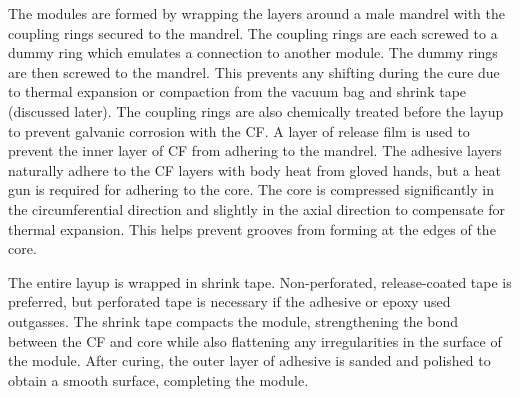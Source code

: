 \documentclass{aiaa-tc}%
\begin{document}
The modules are formed by wrapping the layers around a male mandrel with the coupling rings secured to the mandrel.
The coupling rings are each screwed to a dummy ring which emulates a connection to another module. The dummy rings are then screwed to the mandrel.
This prevents any shifting during the cure due to thermal expansion or compaction from the vacuum bag and shrink tape (discussed later).
The coupling rings are also chemically treated before the layup to prevent galvanic corrosion with the CF.
A layer of release film is used to prevent the inner layer of CF from adhering to the mandrel. 
The adhesive layers naturally adhere to the CF layers with body heat from gloved hands, but a heat gun is required for adhering to the core. 
The core is compressed significantly in the circumferential direction and slightly in the axial direction to compensate for thermal expansion. This helps prevent grooves from forming at the edges of the core.

The entire layup is wrapped in shrink tape. Non-perforated, release-coated tape is preferred, but perforated tape is necessary if the adhesive or epoxy used outgasses.
The shrink tape compacts the module, strengthening the bond between the CF and core while also flattening any irregularities in the surface of the module. 
After curing, the outer layer of adhesive is sanded and polished to obtain a smooth surface, completing the module. 
\end{document}

